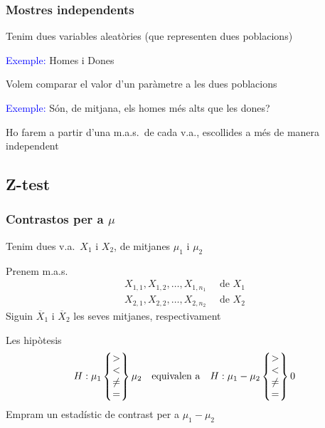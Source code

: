 \documentclass[12pt,t]{beamer}
\newcommand{\blue}[1]{\textcolor{blue}{#1}}
\theoremstyle{plain}
\theoremstyle{definition}
\begin{document}
\begin{frame}
\frametitle{Mostres independents}

Tenim dues variables aleatòries  (que representen dues poblacions)
\medskip

\blue{Exemple:} Homes i Dones
\bigskip

Volem comparar el valor d'un paràmetre a  les dues poblacions
\medskip

\blue{Exemple:} Són, de mitjana, els homes més alts que les dones?
\bigskip

Ho farem a partir d'una m.a.s.\ de cada v.a., escollides a més de manera independent
\end{frame}

\subsection{Z-test}

\begin{frame}
\frametitle{Contrastos per a $\mu$}

Tenim dues v.a.\ $X_1$ i $X_2$, de mitjanes $\mu_1$ i $\mu_2$
\medskip

Prenem m.a.s.
$$
\begin{array}{l}
X_{1,1}, X_{1,2},\ldots, X_{1,n_1}\quad\mbox{ de }X_1\\
X_{2,1}, X_{2,2},\ldots, X_{2,n_2}\quad\mbox{ de }X_2
\end{array}
$$
Siguin $\overline{X}_1$ i $\overline{X}_2$  les seves mitjanes, respectivament
\medskip

Les hipòtesis
$$
H: \mu_1\left\{\hspace*{-1ex}\begin{array}{c} > \\ < \\ \neq\\ = \end{array}\hspace*{-1ex}\right\}\mu_2 \mbox{\quad equivalen a\quad }
H: \mu_1-\mu_2\left\{\hspace*{-1ex}\begin{array}{c} > \\ < \\ \neq\\ = \end{array}\hspace*{-1ex}\right\}0
$$
Empram un estadístic de contrast per a $\mu_1-\mu_2$
\end{frame}
\end{document}
